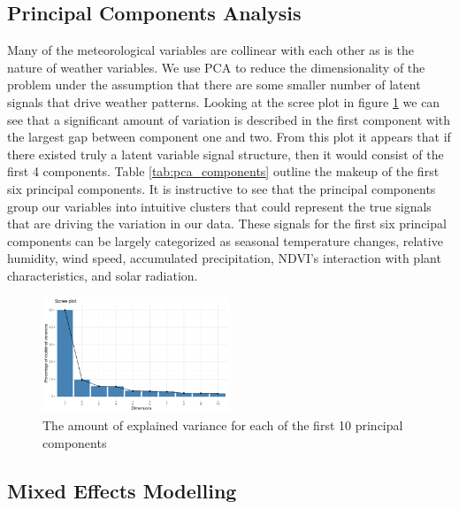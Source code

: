 \documentclass[twocolumn,10pt]{article}
\begin{document}
\subsection{Principal Components Analysis}
Many of the meteorological variables are collinear with each other as is the nature of weather variables. We use PCA to reduce the dimensionality of the problem under the assumption that there are some smaller number of latent signals that drive weather patterns. Looking at the scree plot in figure \ref{fig:screeplot} we can see that a significant amount of variation is described in the first component with the largest gap between component one and two. From this plot it appears that if there existed truly a latent variable signal structure, then it would consist of the first 4 components. Table \ref{tab:pca_components} outline the makeup of the first six principal components. It is instructive to see that the principal components group our variables into intuitive clusters that could represent the true signals that are driving the variation in our data. These signals for the first six principal components can be largely categorized as seasonal temperature changes, relative humidity, wind speed, accumulated precipitation, NDVI's interaction with plant characteristics, and solar radiation. 

\begin{figure}
    \centering
    \includegraphics[scale=0.7, width=0.5\textwidth]{figures/pca/screeplot.png}
    \caption{The amount of explained variance for each of the first 10 principal components}
    \label{fig:screeplot}
\end{figure}

\subsection{Mixed Effects Modelling} \label{sec:hierarchical}
\end{document}
